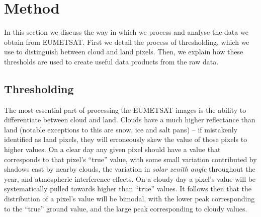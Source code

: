 \section{Method}
In this section we discuss the way in which we process and analyse the data we
obtain from EUMETSAT. First we detail the process of thresholding, which we use
to distinguish between cloud and land pixels. Then, we explain how these
thresholds are used to create useful data products from the raw data.

\subsection{Thresholding}
The most essential part of processing the EUMETSAT images is the ability to
differentiate between cloud and land. Clouds have a much higher reflectance than
land (notable exceptions to this are snow, ice and salt pans) -- if mistakenly
identified as land pixels, they will erroneously skew the value of those pixels
to higher values. On a clear day any given pixel should have a value that
corresponds to that pixel's ``true'' value, with some small variation
contributed by shadows cast by nearby clouds, the variation in \emph{solar
  zenith angle} throughout the year, and atmospheric interference effects. On a
cloudy day a pixel's value will be systematically pulled towards higher than
``true'' values. It follows then that the distribution of a pixel's value will
be bimodal, with the lower peak corresponding to the ``true'' ground value, and
the large peak corresponding to cloudy values.

